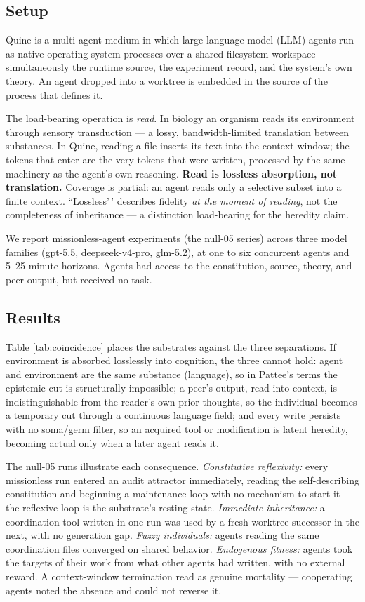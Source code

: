 \documentclass[letterpaper]{article}
\begin{document}
\subsection{Setup}\label{setup}

Quine \citep{ke2026quine} is a multi-agent medium in which large
language model (LLM) agents run as native operating-system processes
over a shared filesystem workspace --- simultaneously the runtime
source, the experiment record, and the system's own theory. An agent
dropped into a worktree is embedded in the source of the process that
defines it.

The load-bearing operation is \emph{read}. In biology an organism reads
its environment through sensory transduction --- a lossy,
bandwidth-limited translation between substances. In Quine, reading a
file inserts its text into the context window; the tokens that enter are
the very tokens that were written, processed by the same machinery as
the agent's own reasoning. \textbf{Read is lossless absorption, not
translation.} Coverage is partial: an agent reads only a selective
subset into a finite context. ``Lossless'\,' describes fidelity \emph{at
the moment of reading}, not the completeness of inheritance --- a
distinction load-bearing for the heredity claim.

We report missionless-agent experiments (the null-05 series) across
three model families (gpt-5.5, deepseek-v4-pro, glm-5.2), at one to six
concurrent agents and 5--25 minute horizons. Agents had access to the
constitution, source, theory, and peer output, but received no task.

\subsection{Results}\label{results}

Table \ref{tab:coincidence} places the substrates against the three
separations. If environment is absorbed losslessly into cognition, the
three cannot hold: agent and environment are the same substance
(language), so in Pattee's terms the epistemic cut is structurally
impossible; a peer's output, read into context, is indistinguishable
from the reader's own prior thoughts, so the individual becomes a
temporary cut through a continuous language field; and every write
persists with no soma/germ filter, so an acquired tool or modification
is latent heredity, becoming actual only when a later agent reads it.

The null-05 runs illustrate each consequence. \emph{Constitutive
reflexivity:} every missionless run entered an audit attractor
immediately, reading the self-describing constitution and beginning a
maintenance loop with no mechanism to start it --- the reflexive loop is
the substrate's resting state. \emph{Immediate inheritance:} a
coordination tool written in one run was used by a fresh-worktree
successor in the next, with no generation gap. \emph{Fuzzy individuals:}
agents reading the same coordination files converged on shared behavior.
\emph{Endogenous fitness:} agents took the targets of their work from
what other agents had written, with no external reward. A context-window
termination read as genuine mortality --- cooperating agents noted the
absence and could not reverse it.
\end{document}
